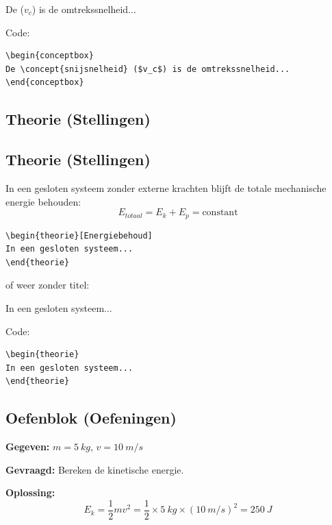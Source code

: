 \documentclass[a4paper,11pt]{article}
\begin{document}
\begin{conceptbox}
De  ($v_c$) is de omtrekssnelheid...
\end{conceptbox}

Code:
\begin{verbatim}
\begin{conceptbox}
De \concept{snijsnelheid} ($v_c$) is de omtrekssnelheid...
\end{conceptbox}
\end{verbatim}

\subsection{Theorie (Stellingen)}

\subsection{Theorie (Stellingen)}

\begin{theorie}[Energiebehoud]
In een gesloten systeem zonder externe krachten blijft de totale mechanische energie behouden:
\[ E_{totaal} = E_k + E_p = \text{constant} \]
\end{theorie}

\begin{verbatim}
\begin{theorie}[Energiebehoud]
In een gesloten systeem...
\end{theorie}
\end{verbatim}

of weer zonder titel:

\begin{theorie}
In een gesloten systeem...
\end{theorie}

Code:
\begin{verbatim}
\begin{theorie}
In een gesloten systeem...
\end{theorie}
\end{verbatim}

\subsection{Oefenblok (Oefeningen)}

\begin{oefenblok}[Oefening 1.1]
\textbf{Gegeven:} $m = \SI{5}{kg}$, $v = \SI{10}{m/s}$

\textbf{Gevraagd:} Bereken de kinetische energie.

\textbf{Oplossing:}
\[ E_k = \frac{1}{2}mv^2 = \frac{1}{2} \times \SI{5}{kg} \times (\SI{10}{m/s})^2 = \SI{250}{J} \]
\end{oefenblok}
\end{document}
